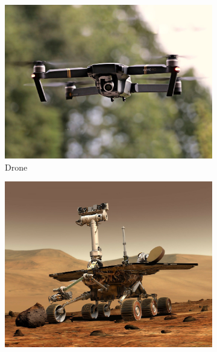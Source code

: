 \begin{figure}[h]
  \begin{subfigure}[b]{0.25\textwidth}
    \includegraphics[width=\textwidth, height=\textwidth]{chapters/images/drone.jpeg}
    \caption{Drone}
    \label{fig:f1}
  \end{subfigure}
  \hfill
  \begin{subfigure}[b]{0.25\textwidth}
    \includegraphics[width=\textwidth, height=\textwidth]{chapters/images/mars.jpg}

\end{subfigure}
\end{figure}
